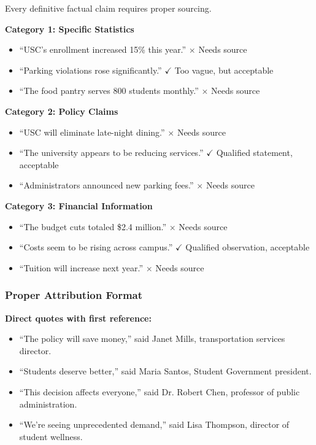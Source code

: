 \documentclass[12pt]{article}
\begin{document}
Every definitive factual claim requires proper sourcing.

\begin{examplebox}
\textbf{Category 1: Specific Statistics}
\begin{itemize}
    \item ``USC's enrollment increased 15\% this year.'' $\times$ Needs source
    \item ``Parking violations rose significantly.'' $\checkmark$ Too vague, but acceptable
    \item ``The food pantry serves 800 students monthly.'' $\times$ Needs source
\end{itemize}
\end{examplebox}

\begin{examplebox}
\textbf{Category 2: Policy Claims}
\begin{itemize}
    \item ``USC will eliminate late-night dining.'' $\times$ Needs source
    \item ``The university appears to be reducing services.'' $\checkmark$ Qualified statement, acceptable
    \item ``Administrators announced new parking fees.'' $\times$ Needs source
\end{itemize}
\end{examplebox}

\begin{examplebox}
\textbf{Category 3: Financial Information}
\begin{itemize}
    \item ``The budget cuts totaled \$2.4 million.'' $\times$ Needs source
    \item ``Costs seem to be rising across campus.'' $\checkmark$ Qualified observation, acceptable
    \item ``Tuition will increase next year.'' $\times$ Needs source
\end{itemize}
\end{examplebox}

\newpage
\subsubsection{Proper Attribution Format}

\begin{examplebox}
\textbf{Direct quotes with first reference:}
\begin{itemize}
    \item ``The policy will save money,'' said Janet Mills, transportation services director.
    \item ``Students deserve better,'' said Maria Santos, Student Government president.
    \item ``This decision affects everyone,'' said Dr. Robert Chen, professor of public administration.
    \item ``We're seeing unprecedented demand,'' said Lisa Thompson, director of student wellness.
\end{itemize}
\end{examplebox}
\end{document}
